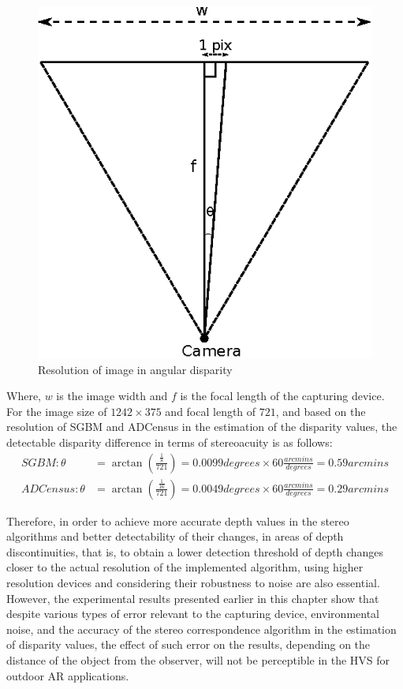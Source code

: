 \begin{figure}[H]
\centering
\includegraphics{camRes}
\caption{Resolution of image in angular disparity}
\label{fig:camResolution}
\end{figure}
\noindent
Where, $w$ is the image width and $f$ is the focal length of the capturing device.
For the image size of $1242\times375$ and focal length of $721$, and based on the resolution of SGBM and ADCensus in the estimation of the disparity values, 
the detectable disparity difference in terms of stereoacuity is as follows:
\begin{align}
\label{eq:algResolution}
SGBM: \theta &= \arctan (\frac{\frac{1}{8}}{721}) = 0.0099 degrees \times 60 \frac{arcmins}{degrees} = 0.59 arcmins \\[2ex]
ADCensus: \theta &= \arctan (\frac{\frac{1}{16}}{721}) = 0.0049 degrees \times 60 \frac{arcmins}{degrees}= 0.29 arcmins
\end{align}

Therefore, in order to achieve more accurate depth values in the stereo algorithms and better detectability of their changes, 
in areas of depth discontinuities, that is, to obtain a lower 
detection threshold of depth changes
closer to the actual resolution of the implemented algorithm, using higher resolution devices and considering their robustness to noise are also essential.
However, the experimental results presented earlier in this chapter
show that despite various types of error relevant to the capturing device, environmental noise, and the accuracy of the stereo correspondence algorithm
in the estimation of disparity values, the effect of such error on the results, depending on the distance of the object from the observer, 
will not be perceptible in the HVS for outdoor AR applications.


